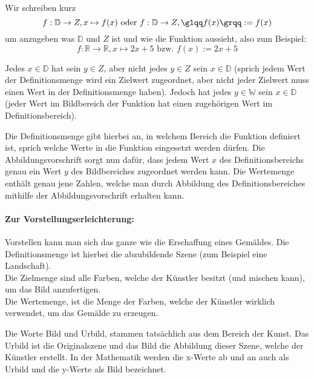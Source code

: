 \begin{flushleft}
Wir schreiben kurz
\begin{equation*}
f : \mathbb{D} \to Z, x \mapsto f(x) \text{ oder } f : \mathbb{D} \to Z, \text{\glqq}f(x)\text{\grqq} := f(x)
\end{equation*}
um anzugeben was $\mathbb{D}$ und $Z$ ist und wie die Funktion aussieht, also zum Beispiel:
\begin{equation*}
f :\mathbb{R} \to \mathbb{R}, x \mapsto 2x + 5 \text{ bzw. } f(x) := 2x + 5
\end{equation*}
\begin{warning}Jedes $x \in \mathbb{D}$ hat sein $y \in Z$, aber nicht jedes $y \in Z$ sein $x \in \mathbb{D}$ (sprich jedem Wert der Definitionsmenge wird ein Zielwert zugeordnet, aber nicht jeder Zielwert muss einen Wert in der Definitionsmenge haben). Jedoch hat jedes $y \in \mathbb{W}$ sein $x \in \mathbb{D}$ (jeder Wert im Bildbereich der Funktion hat einen zugehörigen Wert im Definitionsbereich).
\end{warning}
Die Definitions\-menge gibt hierbei an, in welchem Bereich die Funktion definiert ist, sprich welche Werte \glqq in die Funktion eingesetzt werden dürfen\grqq . Die Abbildungs\-vorschrift sorgt nun dafür, dass jedem Wert $x$ des Definitions\-bereichs genau ein Wert $y$ des Bild\-bereiches zugeordnet werden kann. Die Wertemenge enthält genau jene Zahlen, welche man durch Abbildung des Definitions\-bereiches mithilfe der Abbildungs\-vorschrift erhalten kann.

\paragraph{Zur Vorstellungserleichterung:}
Vorstellen kann man sich das ganze wie die Erschaffung eines Gemäldes. Die Definitionsmenge ist hierbei die abzubildende Szene (zum Beispiel eine Landschaft).\\
Die Zielmenge sind alle Farben, welche der Künstler besitzt (und mischen kann), um das Bild anzufertigen.\\
Die Wertemenge, ist die Menge der Farben, welche der Künstler wirklich verwendet, um das Gemälde zu erzeugen.

\begin{warning}
	Die Worte Bild und Urbild, stammen tatsächlich aus dem Bereich der Kunst. Das Urbild ist die Originalszene und das Bild die Abbildung dieser Szene, welche der Künstler erstellt. In der Mathematik werden die x-Werte ab und an auch als Urbild und die y-Werte als Bild bezeichnet.
\end{warning}


\end{flushleft}
